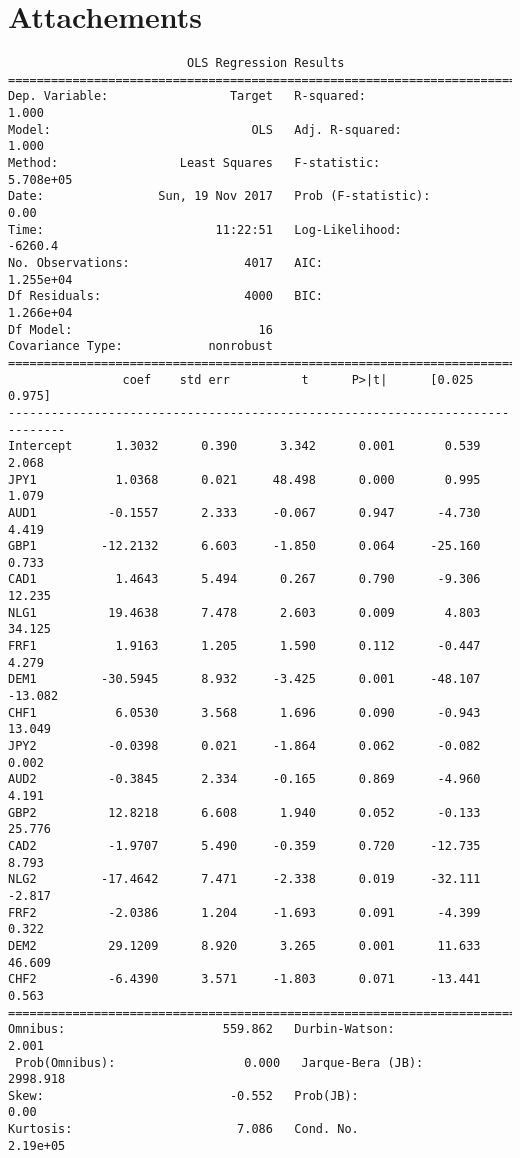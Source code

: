 \section{Attachements}
\begin{verbatim}
                         OLS Regression Results                            
==============================================================================
Dep. Variable:                 Target   R-squared:                       1.000
Model:                            OLS   Adj. R-squared:                  1.000
Method:                 Least Squares   F-statistic:                 5.708e+05
Date:                Sun, 19 Nov 2017   Prob (F-statistic):               0.00
Time:                        11:22:51   Log-Likelihood:                -6260.4
No. Observations:                4017   AIC:                         1.255e+04
Df Residuals:                    4000   BIC:                         1.266e+04
Df Model:                          16                                         
Covariance Type:            nonrobust                                         
==============================================================================
                coef    std err          t      P>|t|      [0.025      0.975]
------------------------------------------------------------------------------
Intercept      1.3032      0.390      3.342      0.001       0.539       2.068
JPY1           1.0368      0.021     48.498      0.000       0.995       1.079
AUD1          -0.1557      2.333     -0.067      0.947      -4.730       4.419
GBP1         -12.2132      6.603     -1.850      0.064     -25.160       0.733
CAD1           1.4643      5.494      0.267      0.790      -9.306      12.235
NLG1          19.4638      7.478      2.603      0.009       4.803      34.125
FRF1           1.9163      1.205      1.590      0.112      -0.447       4.279
DEM1         -30.5945      8.932     -3.425      0.001     -48.107     -13.082
CHF1           6.0530      3.568      1.696      0.090      -0.943      13.049
JPY2          -0.0398      0.021     -1.864      0.062      -0.082       0.002
AUD2          -0.3845      2.334     -0.165      0.869      -4.960       4.191
GBP2          12.8218      6.608      1.940      0.052      -0.133      25.776
CAD2          -1.9707      5.490     -0.359      0.720     -12.735       8.793
NLG2         -17.4642      7.471     -2.338      0.019     -32.111      -2.817
FRF2          -2.0386      1.204     -1.693      0.091      -4.399       0.322
DEM2          29.1209      8.920      3.265      0.001      11.633      46.609
CHF2          -6.4390      3.571     -1.803      0.071     -13.441       0.563
==============================================================================
Omnibus:                      559.862   Durbin-Watson:                   2.001
 Prob(Omnibus):                  0.000   Jarque-Bera (JB):             2998.918
Skew:                          -0.552   Prob(JB):                         0.00
Kurtosis:                       7.086   Cond. No.                     2.19e+05
\end{verbatim}






